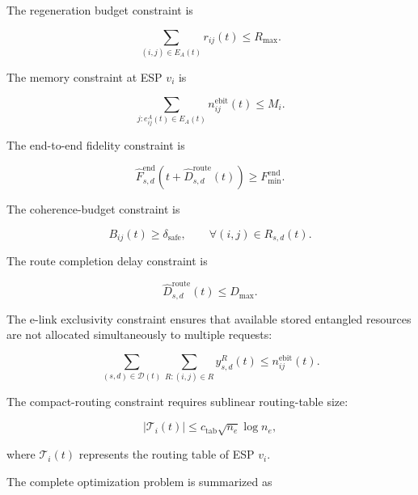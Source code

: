 The regeneration budget constraint is

\begin{equation}
    \sum_{(i,j)\in E_A(t)}
    r_{ij}(t)
    \leq
    R_{\max}.
\end{equation}


The memory constraint at ESP $v_i$ is

\begin{equation}
    \sum_{j:e_{ij}^{A}(t)\in E_A(t)}
    n_{ij}^{\mathrm{ebit}}(t)
    \leq
    M_i .
\end{equation}


The end-to-end fidelity constraint is

\begin{equation}
    \widehat{F}_{s,d}^{\mathrm{end}}
    \left(
    t+
    \widehat{D}_{s,d}^{\mathrm{route}}(t)
    \right)
    \geq
    F_{\min}^{\mathrm{end}} .
\end{equation}


The coherence-budget constraint is

\begin{equation}
    B_{ij}(t)
    \geq
    \delta_{\mathrm{safe}},
    \qquad
    \forall(i,j)\in R_{s,d}(t).
\end{equation}


The route completion delay constraint is

\begin{equation}
    \widehat{D}_{s,d}^{\mathrm{route}}(t)
    \leq
    D_{\max}.
\end{equation}


The e-link exclusivity constraint ensures that available stored entangled resources are not allocated simultaneously to multiple requests:

\begin{equation}
    \sum_{(s,d)\in\mathcal{D}(t)}
    \sum_{R:(i,j)\in R}
    y_{s,d}^{R}(t)
    \leq
    n_{ij}^{\mathrm{ebit}}(t).
\end{equation}


The compact-routing constraint requires sublinear routing-table size:

\begin{equation}
    |\mathcal{T}_i(t)|
    \leq
    c_{\mathrm{tab}}
    \sqrt{n_e}
    \log n_e ,
\end{equation}

where $\mathcal{T}_i(t)$ represents the routing table of ESP $v_i$.


The complete optimization problem is summarized as

